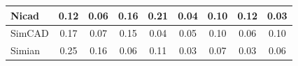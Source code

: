\documentclass[review]{elsarticle}
\begin{document}
\begin{table}[htbp]
\begin{tabular}{|l|c|c|c|c|c|c|c|c|}
Nicad                                   & 0.12            & 0.06              & 0.16           & 0.21           & 0.04             & 0.10            & 0.12           & 0.03         \\ \hline
SimCAD                                  & 0.17            & 0.07              & 0.15           & 0.04           & 0.05             & 0.10            & 0.06           & 0.10         \\ \hline
Simian                                  & 0.25            & 0.16              & 0.06           & 0.11           & 0.03             & 0.07            & 0.03           & 0.06         \\ \hline
\end{tabular}
\end{table}
\end{document}
